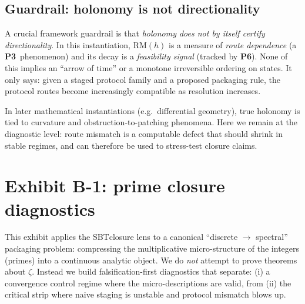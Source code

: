 \documentclass[apajournal,article,submit,moreauthors,pdftex]{Definitions/mdpi}
\newcommand{\SBT}{\textsc{SBT}}
\newcommand{\Pthree}{\textbf{P3}}
\newcommand{\Psix}{\textbf{P6}}
\begin{document}
\subsection{Guardrail: holonomy is not directionality}
A crucial framework guardrail is that \emph{holonomy does not by itself certify directionality}.
In this instantiation, $\mathrm{RM}(h)$ is a measure of \emph{route dependence} (a \Pthree\ phenomenon) and its decay is a \emph{feasibility signal} (tracked by \Psix).
None of this implies an ``arrow of time'' or a monotone irreversible ordering on states.
It only says: given a staged protocol family and a proposed packaging rule, the protocol routes become increasingly compatible as resolution increases.

In later mathematical instantiations (e.g.\ differential geometry), true holonomy is tied to curvature and obstruction-to-patching phenomena.
Here we remain at the diagnostic level: route mismatch is a computable defect that should shrink in stable regimes, and can therefore be used to stress-test closure claims.
 \section{Exhibit B-1: prime closure diagnostics}
\label{sec:exhibit-prime}

This exhibit applies the \SBT closure lens to a canonical ``discrete $\rightarrow$ spectral'' packaging problem:
compressing the multiplicative micro-structure of the integers (primes) into a continuous analytic object.
We do \emph{not} attempt to prove theorems about $\zeta$.
Instead we build falsification-first diagnostics that separate:
(i) a convergence control regime where the micro-descriptions are valid, from
(ii) the critical strip where naive staging is unstable and protocol mismatch blows up.
\end{document}
